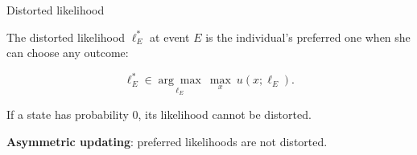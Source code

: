 \documentclass[usenames,dvipsnames,aspectratio=169,11pt, envcountsect, handout]{beamer}
\begin{document}
\begin{comment}

\begin{frame}{Preference representation}

	Individual's behaviour is represented by the following model

	\vfill

	\begin{equation}\label{eq:contmenu1}
		\mathscr{U}(F)= \sum_{M} \sum_{s} p \left( s \right) F_{s} \left( M \right) \mathcal{U} \left(M ; \ell_{M, F} \right) \: ;
	\end{equation} \pause

	\vfill

	\begin{equation}\label{eq:menu1}
		\begin{aligned}
			\mathcal{U} \left(M ; \ell_{M, F} \right) = & \max _{f \in M}\left\{\sum_{s} p_{\ell_{M, F}} \left( s \right) u \left( f_{s} ; \ell_{M, F} \right) + \alpha_{\ell_{M, F}} \sum_{s} p_{\ell^{*}_{M, F}} \left( s \right) u \left( f_{s} ; \ell^{*}_{M, F} \right) \right\} \\
			                                            & -\max _{f^{\prime} \in M} \alpha _{\ell_{M, F}} \sum_{s} p_{\ell^{*}_{M, F}} \left( s \right) u\left(f^{\prime}_{s} ; \ell^{*}_{M, F} \right) \: .
		\end{aligned}
	\end{equation}

	\vfill

	I interpret the number \( \alpha_{\ell_{M, F}} \) as the strength of "motivated reasoning". \hyperlink{alpha}{\beamerbutton{More}}

\end{frame}

\end{comment}

\begin{frame}{Distorted likelihood}

	The distorted likelihood \( \ell^{*}_E \) at event \( E \) is the individual's preferred one when she can choose any outcome:

	\vfill

	\[
		\ell^{*}_{E} \in \underset{\ell_{E}}{\arg \max} \: \max_{x } \: u \left( x ; \ell_E \right) .
	\] \pause

	\vfill

	If a state has probability \( 0 \), its likelihood cannot be distorted. \pause

	\vfill

	\textbf{Asymmetric updating}: preferred likelihoods are not distorted.

\end{frame}
\end{document}

